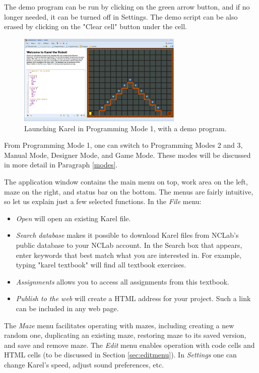 The demo program can be run by clicking on the green arrow button, and 
if no longer needed, it can be turned off in Settings. The demo script 
can be also erased by clicking on the "Clear cell" button under the cell.

\newpage

\begin{figure}[!ht]
\begin{center}
\includegraphics[width=0.7\textwidth]{img/init.png}
\end{center}
\vspace{-2mm}
\caption{Launching Karel in Programming Mode 1, with a demo program.}
\label{fig:init}
\end{figure}

\noindent
From Programming Mode 1, one can switch to Programming Modes 2 and 3,
Manual Mode, Designer Mode, and Game Mode. These modes will be discussed 
in more detail in Paragraph \ref{modes}.

The application window contains the main menu on top,
work area on the left, maze on the right, and status bar on the bottom.
The menus are fairly intuitive, so let us explain just a few selected 
functions. In the {\em File} menu:

\begin{itemize}
\item {\em Open} will open an existing Karel file.
\item {\em Search database} makes it possible to download Karel files from NCLab's
      public database to your NCLab account. In the Search box that appears, enter 
      keywords that best match what you are interested in. For example, typing 
      "karel textbook" will find all textbook exercises.  
\item {\em Assignments} allows you to access all assignments from this textbook. 
\item {\em Publish to the web} will create a HTML address for your project. Such 
      a link can be included in any web page. 
\end{itemize}
The {\em Maze} menu facilitates operating with mazes, including creating a new random 
one, duplicating an existing maze, restoring maze to its saved version, and save and remove 
maze. The {\em Edit} menu enables operation with code cells and HTML cells (to be discussed in 
Section \ref{sec:editmenu}). In {\em Settings} one can change Karel's speed, adjust sound 
preferences, etc.

